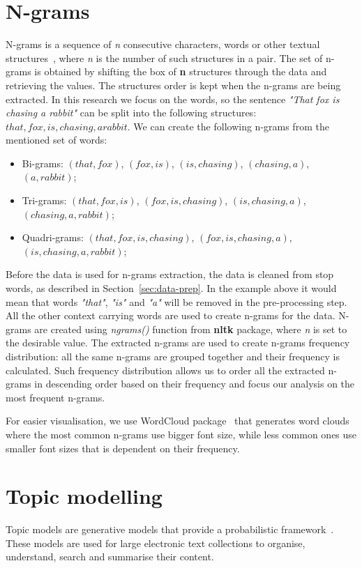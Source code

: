 \section{N-grams}
N-grams is a sequence of \textit{n} consecutive characters, words or other textual structures~\cite{n-grams}, where \textit{n} is the number of such structures in a pair. The set of n-grams is obtained by shifting the box of \textbf{n} structures through the data and retrieving the values. The structures order is kept when the n-grams are being extracted. In this research we focus on the words, so the sentence \textit{"That fox is chasing a rabbit"} can be split into the following structures: ${that, fox, is, chasing, a rabbit}$. We can create the following n-grams from the mentioned set of words:
\begin{itemize}
    \item Bi-grams: $(that, fox)$, $(fox, is)$, $(is, chasing)$, $(chasing, a)$, $(a, rabbit)$; 
    \item Tri-grams: $(that, fox, is)$, $(fox, is, chasing)$, $(is, chasing, a)$, \\$(chasing, a, rabbit)$;
    \item Quadri-grams: $(that, fox, is, chasing)$, $(fox, is, chasing, a)$, \\$(is, chasing, a, rabbit)$;
\end{itemize}

Before the data is used for n-grams extraction, the data is cleaned from stop words, as described in Section~\ref{sec:data-prep}. In the example above it would mean that words \textit{"that"}, \textit{"is"} and \textit{"a"} will be removed in the pre-processing step. All the other context carrying words are used to create n-grams for the data. N-grams are created using \textit{ngrams()} function from \textbf{nltk} package, where \textit{n} is set to the desirable value. The extracted n-grams are used to create n-grams frequency distribution: all the same n-grams are grouped together and their frequency is calculated. Such frequency distribution allows us to order all the extracted n-grams in descending order based on their frequency and focus our analysis on the most frequent n-grams. 

For easier visualisation, we use WordCloud package~\cite{wordcloud} that generates word clouds where the most common n-grams use bigger font size, while less common ones use smaller font sizes that is dependent on their frequency.

\section{Topic modelling}
Topic models are generative models that provide a probabilistic framework~\cite{topic-model}. These models are used for large electronic text collections to organise, understand, search and summarise their content. 

